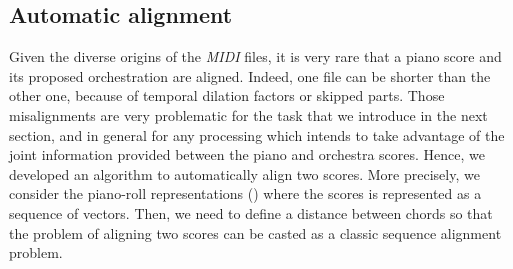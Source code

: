 \documentclass[twoside,twocolumn]{article}
\begin{document}
\subsection{Automatic alignment}

\label{:automatic-alignment}
Given the diverse origins of the \textit{MIDI} files, it is very rare that a piano score and its proposed orchestration are aligned. Indeed, one file can be shorter than the other one, because of temporal dilation factors or skipped parts.
Those misalignments are very problematic for the task that  we introduce in the next section, and in general for any processing which intends to take advantage of the joint information provided between the piano and orchestra scores. Hence, we developed an algorithm to automatically align two scores.
More precisely, we consider the piano-roll representations () where the scores is represented as a sequence of vectors. Then, we need to define a distance between chords so that the problem of aligning two scores can be casted as a classic sequence alignment problem.
\end{document}
